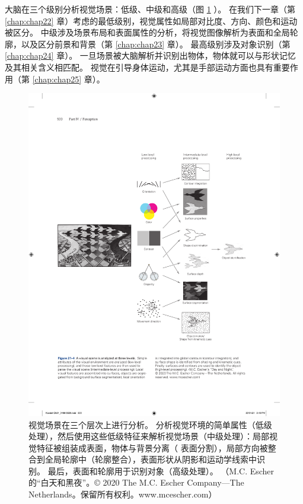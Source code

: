 大脑在三个级别分析视觉场景：低级、中级和高级（图 \ref{fig:21_4} ）。 
在我们下一章（第 \ref{chap:chap22} 章）考虑的最低级别，视觉属性如局部对比度、方向、颜色和运动被区分。 
中级涉及场景布局和表面属性的分析，将视觉图像解析为表面和全局轮廓，以及区分前景和背景（第 \ref{chap:chap23} 章）。 
最高级别涉及对象识别（第 \ref{chap:chap24} 章）。 
一旦场景被大脑解析并识别出物体，物体就可以与形状记忆及其相关含义相匹配。 
视觉在引导身体运动，尤其是手部运动方面也具有重要作用（第 \ref{chap:chap25} 章）。


\begin{figure}[htbp]
	\centering
	\includegraphics[width=1.0\linewidth]{chap21/fig_21_4}
	\caption{视觉场景在三个层次上进行分析。 
		分析视觉环境的简单属性（低级处理），然后使用这些低级特征来解析视觉场景（中级处理）：局部视觉特征被组装成表面，物体与背景分离（ 表面分割），局部方向被整合到全局轮廓中（轮廓整合），表面形状从阴影和运动学线索中识别。 
		最后，表面和轮廓用于识别对象（高级处理）。 （M.C. Escher 的“白天和黑夜”。© 2020 The M.C. Escher Company—The Netherlands。保留所有权利。www.mcescher.com）}
	\label{fig:21_4}
\end{figure}

